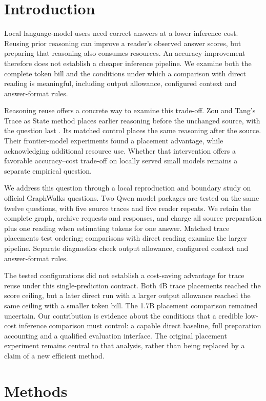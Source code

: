 \section{Introduction}
Local language-model users need correct answers at a lower inference cost. Reusing prior reasoning can improve a reader's observed answer scores, but preparing that reasoning also consumes resources. An accuracy improvement therefore does not establish a cheaper inference pipeline. We examine both the complete token bill and the conditions under which a comparison with direct reading is meaningful, including output allowance, configured context and answer-format rules.

Reasoning reuse offers a concrete way to examine this trade-off. Zou and Tang's Trace as State method places earlier reasoning before the unchanged source, with the question last \citep{tang2026trace}. Its matched control places the same reasoning after the source. Their frontier-model experiments found a placement advantage, while acknowledging additional resource use. Whether that intervention offers a favorable accuracy--cost trade-off on locally served small models remains a separate empirical question.

We address this question through a local reproduction and boundary study on official GraphWalks questions. Two Qwen model packages are tested on the same twelve questions, with five source traces and five reader repeats. We retain the complete graph, archive requests and responses, and charge all source preparation plus one reading when estimating tokens for one answer. Matched trace placements test ordering; comparisons with direct reading examine the larger pipeline. Separate diagnostics check output allowance, configured context and answer-format rules.

The tested configurations did not establish a cost-saving advantage for trace reuse under this single-prediction contract. Both 4B trace placements reached the score ceiling, but a later direct run with a larger output allowance reached the same ceiling with a smaller token bill. The 1.7B placement comparison remained uncertain. Our contribution is evidence about the conditions that a credible low-cost inference comparison must control: a capable direct baseline, full preparation accounting and a qualified evaluation interface. The original placement experiment remains central to that analysis, rather than being replaced by a claim of a new efficient method.

\section{Methods}
\label{sec:migration-contract}
